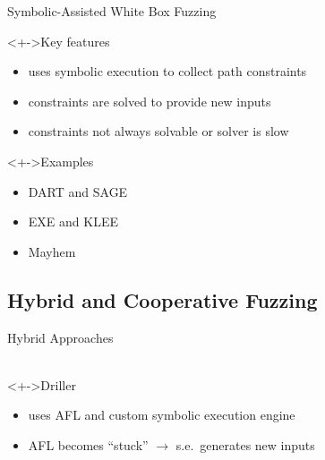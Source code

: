\documentclass[handout]{beamer}
\begin{document}
\begin{frame}{Symbolic-Assisted White Box Fuzzing}
    \begin{block}<+->{Key features}
        \begin{itemize}[<+->]
            \item{} uses symbolic execution to collect path constraints
            \item{} constraints are solved to provide new inputs
            \item<+-|alert@+-> \alert{constraints not always solvable or solver is slow}
        \end{itemize}
    \end{block}
    \begin{exampleblock}<+->{Examples}
        \begin{itemize}[<+->]
            \item{} DART and SAGE
            \item{} EXE and KLEE
            \item{} Mayhem
        \end{itemize}
    \end{exampleblock}
\end{frame}

\subsection{Hybrid and Cooperative Fuzzing}

\begin{frame}{Hybrid Approaches}
    \\~\\
    \begin{exampleblock}<+->{Driller}
        \begin{itemize}
            \item{} uses AFL and custom symbolic execution engine
            \item{} AFL becomes ``stuck'' $\rightarrow$ s.e.\ generates new inputs
        \end{itemize}
    \end{exampleblock}
\end{frame}
\end{document}

